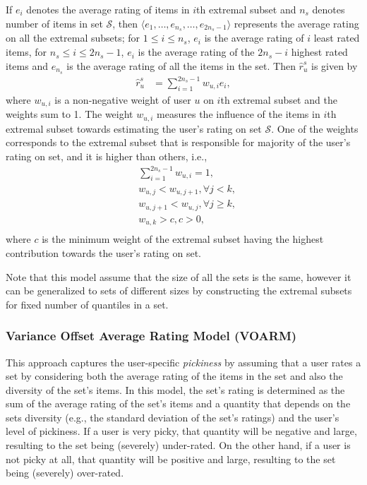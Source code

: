 If $e_i$ denotes the average rating of items in $i$th extremal
subset and $n_s$ denotes number of items in set $\mathcal{S}$, 
then $\langle e_1, \ldots, e_{n_s}, \ldots, e_{2n_s - 1} \rangle$ represents
the average rating on all the extremal subsets; for $1 \le i \le
n_s$, $e_i$ is the average rating of $i$ least rated
items, for $n_s \le i \le 2n_s - 1 $, $e_i$ is the average rating
of the $2n_s - i$ highest rated items and $e_{n_s}$ is the average rating of all
the items in the set. Then $\hat{r}_{u}^s$ is given by
\begin{equation} \label{avgbuckacteq}
  \begin{split}
    \hat{r}_{u}^s &= \sum_{i=1}^{2n_s - 1} w_{u,i} e_{i},
  \end{split}
\end{equation}
\noindent where $w_{u,i}$ is a non-negative weight of user $u$ on
$i$th extremal subset and the weights sum to 1.
The weight $w_{u,i}$ measures the influence of the items in $i$th extremal subset 
towards estimating the user's rating on set $\mathcal{S}$.
One of the weights corresponds to the extremal subset that is responsible for majority of the user's rating on set, and it is higher than others, i.e.,
\begin{equation} \label{esqpmodel_eq}
	\begin{aligned}  
        & \sum_{i=1}^{2n_s - 1}w_{u,i}=1,  \\
        & w_{u, j} < w_{u, j+1}, \forall j < k, \\
        & w_{u, j+1} < w_{u, j}, \forall j \ge k, \\
        & w_{u,k} > c,  c > 0, \\
     \end{aligned}
\end{equation}
\noindent where $c$ is the minimum weight of the extremal subset having the
    highest contribution towards the user's rating on set.


Note that this model assume
that the size of all the sets is the same, however it can be generalized to sets
of different sizes by constructing the extremal subsets for fixed number
of quantiles in a set.



\subsubsection*{Variance Offset Average Rating Model (VOARM)}
This approach captures the user-specific \emph{pickiness} by assuming 
that a user rates a set by considering both the
average rating of the items in the set
and also the diversity of the set's items. In this model, the set's rating is
determined as the sum of the average
rating of the set's items and a quantity that depends on the sets diversity
(e.g.,
the standard deviation of the set's ratings) and the user's level of
pickiness. 
If a user is very picky, that quantity will be
negative and large, resulting to the set being
(severely) under-rated. On the other hand, if a user is not picky at all, that
quantity will be positive and large, resulting to the 
set being (severely) over-rated. 


